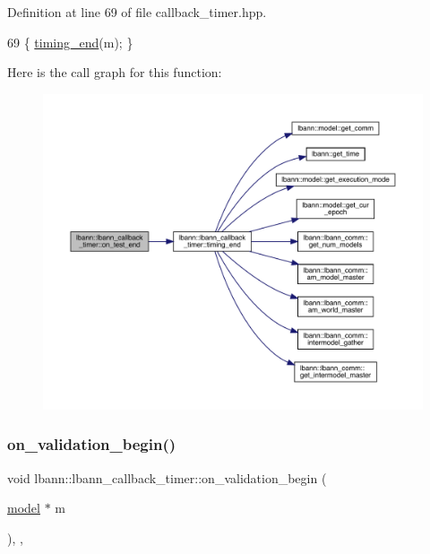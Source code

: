 Definition at line 69 of file callback\+\_\+timer.\+hpp.


\begin{DoxyCode}
69 \{ \hyperlink{classlbann_1_1lbann__callback__timer_a955e59858c6803e96b21fe494cdf3971}{timing\_end}(m); \}
\end{DoxyCode}
Here is the call graph for this function\+:\nopagebreak
\begin{figure}[H]
\begin{center}
\leavevmode
\includegraphics[width=350pt]{classlbann_1_1lbann__callback__timer_ab7db32c743128f8bcfc35c8ea56c226a_cgraph}
\end{center}
\end{figure}
\mbox{\label{classlbann_1_1lbann__callback__timer_aa86c0ae1b6fbc878b6ba9a4551b803b8}} 
\subsubsection{\texorpdfstring{on\+\_\+validation\+\_\+begin()}{on\_validation\_begin()}}
{\footnotesize\ttfamily void lbann\+::lbann\+\_\+callback\+\_\+timer\+::on\+\_\+validation\+\_\+begin (\begin{DoxyParamCaption}\item[{\hyperlink{classlbann_1_1model}{model} $\ast$}]{m }\end{DoxyParamCaption})\hspace{0.3cm}{\ttfamily [inline]}, {\ttfamily [override]}, {\ttfamily [virtual]}}

